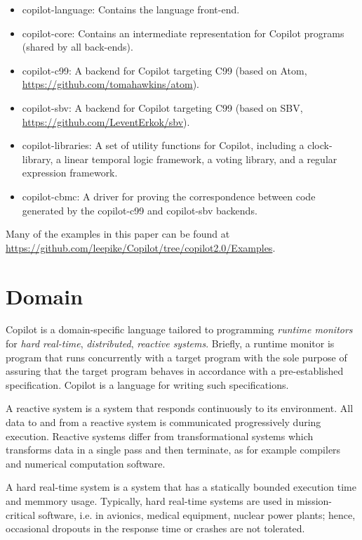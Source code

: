 \documentclass[]{article}
\theoremstyle{example}
\begin{document}
\begin{itemize}
\item copilot-language: Contains the language front-end.
\item copilot-core: Contains an intermediate representation for Copilot programs (shared by all back-ends).
\item copilot-c99: A backend for Copilot targeting C99 (based on Atom, \url{https://github.com/tomahawkins/atom}).
\item copilot-sbv: A backend for Copilot targeting C99 (based on SBV, \url{https://github.com/LeventErkok/sbv}).
\item copilot-libraries: A set of utility functions for Copilot, including a clock-library, a linear temporal logic framework,
a voting library, and a regular expression framework.
\item copilot-cbmc: A driver for proving the correspondence between code
  generated by the copilot-c99 and copilot-sbv backends.
\end{itemize}

Many of the examples in this paper can be found at \url{https://github.com/leepike/Copilot/tree/copilot2.0/Examples}.
\section{Domain}

Copilot is a domain-specific language tailored to programming \emph{runtime
monitors} for \emph{hard real-time}, \emph{distributed}, \emph{reactive systems}.
Briefly, a runtime monitor is program that runs concurrently with a target program
with the sole purpose of assuring that the target program behaves in accordance with a
pre-established specification. Copilot is a language for writing such specifications.

A reactive system is a system that responds continuously to its environment.
All data to and from a reactive system is communicated progressively during
execution. Reactive systems differ from transformational systems which transforms
data in a single pass and then terminate, as for example compilers and numerical
computation software.

A hard real-time system is a system that has a statically bounded execution time and memmory usage.
Typically, hard real-time systems are used in mission-critical software, i.e.
in avionics, medical equipment, nuclear power plants; hence, occasional dropouts
in the response time or crashes are not tolerated.
\end{document}
